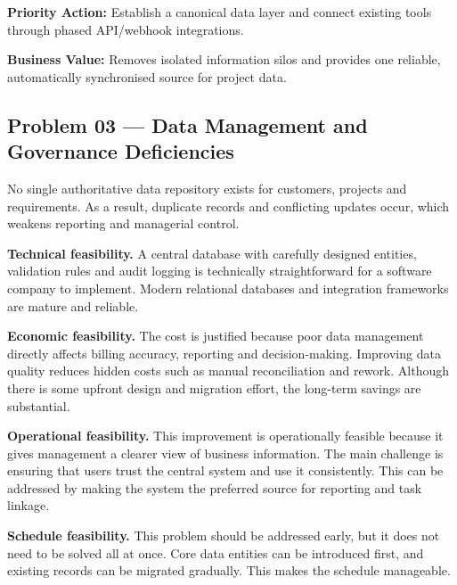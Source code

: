 \documentclass[12pt,a4paper]{report}
\begin{document}
\begin{recommendBox}
\textbf{Priority Action:} Establish a canonical data layer and connect existing tools through phased API/webhook integrations.

\textbf{Business Value:} Removes isolated information silos and provides one reliable, automatically synchronised source for project data.
\end{recommendBox}

\subsection{Problem 03 --- Data Management and Governance Deficiencies}

\begin{problemBox}
No single authoritative data repository exists for customers, projects and requirements. As a result, duplicate records and conflicting updates occur, which weakens reporting and managerial control.
\end{problemBox}

\textbf{Technical feasibility.} A central database with carefully designed entities, validation rules and audit logging is technically straightforward for a software company to implement. Modern relational databases and integration frameworks are mature and reliable.

\textbf{Economic feasibility.} The cost is justified because poor data management directly affects billing accuracy, reporting and decision-making. Improving data quality reduces hidden costs such as manual reconciliation and rework. Although there is some upfront design and migration effort, the long-term savings are substantial.

\textbf{Operational feasibility.} This improvement is operationally feasible because it gives management a clearer view of business information. The main challenge is ensuring that users trust the central system and use it consistently. This can be addressed by making the system the preferred source for reporting and task linkage.

\textbf{Schedule feasibility.} This problem should be addressed early, but it does not need to be solved all at once. Core data entities can be introduced first, and existing records can be migrated gradually. This makes the schedule manageable.
\end{document}
